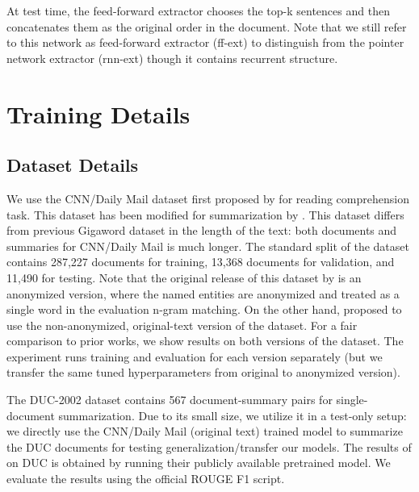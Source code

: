 \documentclass[11pt,a4paper]{article}
\begin{document}
At test time, the feed-forward extractor chooses the top-k sentences and then concatenates them as the original order in the document.
Note that we still refer to this network as feed-forward extractor (ff-ext) to distinguish from the pointer network extractor (rnn-ext) though it contains recurrent structure.


\section{Training Details}

\subsection{Dataset Details}
\label{sec:data}
We use the CNN/Daily Mail dataset first proposed by \citet{nips15_hermann} 
for reading comprehension task.
This dataset has been modified for summarization by \citet{AAAI17:summarunner}.
This dataset differs from previous Gigaword dataset \cite{rush-chopra-weston:2015:EMNLP} in the length of the text: 
both documents and summaries for CNN/Daily Mail is much longer.
The standard split of the dataset contains 287,227 documents for training, 13,368 documents for validation, and 11,490 for testing.
Note that the original release of this dataset by \citet{nips15_hermann} is an anonymized version, where the
named entities are anonymized and treated as a single word in the evaluation n-gram matching.
On the other hand, \citet{get_to_the_point} proposed to use the non-anonymized, original-text version of the dataset.
For a fair comparison to prior works, we show results on both versions of the dataset.
The experiment runs training and evaluation for each version separately (but we transfer the same tuned hyperparameters from original to anonymized version).

The DUC-2002 dataset contains 567 document-summary pairs for single-document summarization. 
Due to its small size, we utilize it in a test-only setup: we directly use the CNN/Daily Mail (original text) trained model to summarize the DUC documents for testing generalization/transfer our models.
The results of \citet{get_to_the_point} on DUC is obtained by running their publicly available pretrained model.
We evaluate the results using the official ROUGE F1 script.
\end{document}
